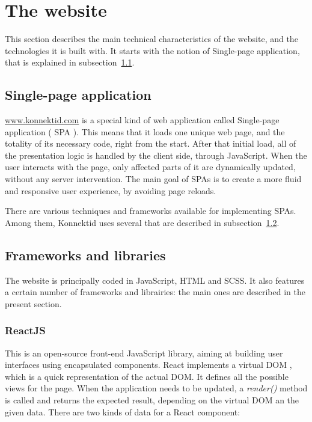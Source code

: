 \section{The website}
\label{sec:website}

This section describes the main technical characteristics of the website, and the technologies it is built with.
It starts with the notion of Single-page application, that is explained in {\sc subsection}~\ref{ssec:spa}.

\subsection{Single-page application}
\label{ssec:spa}

\url{www.konnektid.com} is a special kind of web application called Single-page application (\guillemotleft{} SPA \guillemotright{}).
This means that it loads one unique web page, and the totality of its necessary code, right from the start.
After that initial load, all of the presentation logic is handled by the client side, through JavaScript.
When the user interacts with the page, only affected parts of it are dynamically updated, without any server intervention.
The main goal of SPAs is to create a more fluid and responsive user experience, by avoiding page reloads.

There are various techniques and frameworks available for implementing SPAs.
Among them, Konnektid uses several that are described in {\sc subsection}~\ref{ssec:frameworks}.

\subsection{Frameworks and libraries}
\label{ssec:frameworks}

The website is principally coded in JavaScript, HTML and SCSS. It also features a certain number of frameworks and librairies: the main ones are described in the present section.

\subsubsection{ReactJS}
\label{sssec:react}

This is an open-source front-end JavaScript library, aiming at building user interfaces using encapsulated components. React implements a \guillemotleft{} virtual DOM \guillemotright{}, which is a quick representation of the actual DOM. It defines all the possible views for the page. When the application needs to be updated, a \textit{render()} method is called and returns the expected result, depending on the virtual DOM an the given data. There are two kinds of data for a React component:

